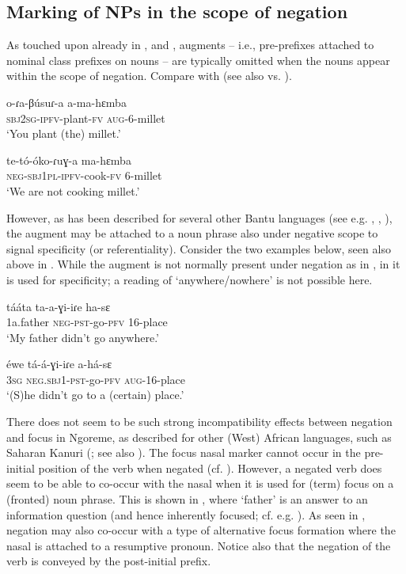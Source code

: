\documentclass[output=paper,colorlinks,citecolor=brown,draftmode]{langscibook}
\begin{document}
\subsection{Marking of NPs in the scope of negation}\label{sec:ngo:4.3}

As touched upon already in ,  and , augments – i.e., pre-prefixes attached to nominal class prefixes on nouns – are typically omitted when the nouns appear within the scope of negation. Compare  with  (see also  vs. ).

\ea\label{ex:ngo:76} 
    \gll o-ɾa-βúsuɾ-a a-ma-hɛmba\\ 
        \textsc{sbj2sg-ipfv}{}-plant-\textsc{fv} \textsc{aug}{}-6-millet\\
    \glt ‘You plant (the) millet.’
\z 

\ea\label{ex:ngo:77} 
    \gll te-tó-óko-ɾuɣ-a ma-hɛmba\\ 
        \textsc{neg-sbj1pl-ipfv-}cook-\textsc{fv} 6-millet\\
 \glt ‘We are not cooking millet.’
\z 

However, as has been described for several other Bantu languages (see e.g. \citealt{Givon1978}, \citealt{Velde2019}, \citealt{Miestamo2014}), the augment may be attached to a noun phrase also under negative scope to signal specificity (or referentiality). Consider the two examples below, seen also above in . While the augment is not normally present under negation as in , in  it is used for specificity; a reading of ‘anywhere/nowhere’ is not possible here. 

\ea\label{ex:ngo:78} 
    \gll tááta ta-a-ɣi-iɾe ha-sɛ\\ 
        1a.father \textsc{neg-pst}{}-go-\textsc{pfv} \textsc{16-}place\\
\glt ‘My father didn’t go anywhere.’
\z 

\ea\label{ex:ngo:79} 
    \gll éwe tá{}-á{}-ɣi-iɾe a-há{}-sɛ\\ 
        3\textsc{sg} \textsc{neg.sbj1-pst}{}-go-\textsc{pfv} \textsc{aug-}16-place\\
    \glt ‘(S)he didn’t go to a (certain) place.’
\z 

There does not seem to be such strong incompatibility effects between negation and focus in Ngoreme, as described for other (West) African languages, such as Saharan Kanuri (\citealt{Cyffer2009}; see also \citealt{Miestamo2014}). The focus nasal marker cannot occur in the pre-initial position of the verb when negated (cf. ). However, a negated verb does seem to be able to co-occur with the nasal when it is used for (term) focus on a (fronted) noun phrase. This is shown in , where ‘father’ is an answer to an information question (and hence inherently focused; cf. e.g. \citealt[282--286]{Lambrecht1994}). As seen in , negation may also co-occur with a type of alternative focus formation where the nasal is attached to a resumptive pronoun. Notice also that the negation of the verb is conveyed by the post-initial prefix.
\end{document}
